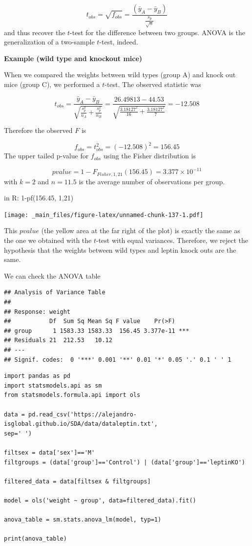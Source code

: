 \documentclass[
]{book}
\begin{document}
\[t_{obs}=\sqrt{f_{obs}}=\frac{(\bar{y}_{A}-\bar{y}_{B})}{\frac{s_p}{\sqrt{n}}}\]
and thus recover the \(t\)-test for the difference between two groups. ANOVA is the generalization of a two-sample \(t\)-test, indeed.

\textbf{Example (wild type and knockout mice)}

When we compared the weights between wild types (group A) and knock out mice (group C), we performed a \(t\)-test. The observed statistic was

\[t_{obs}=\frac{\bar{y}_A-\bar{y}_B }{\sqrt{\frac{s^2_p}{n_A}+\frac{s^2_p}{n_B}}}=\frac{26.49813-44.53}{\sqrt{\frac{3.18127^2}{16}+\frac{3.18127^2}{7}}}=-12.508\]

Therefore the observed \(F\) is

\[f_{obs}=t_{obs}^2=(−12.508)^2=156.45\]
The upper tailed p-value for \(f_{obs}\) using the Fisher distribution is

\[pvalue=1-F_{Fisher,1,21}(156.45)=3.377 \times 10^{-11}\] with \(k=2\) and \(n=11.5\) is the average number of observations per group.

in R: 1-pf(156.45, 1,21)

\texttt{[image: \_main\_files/figure-latex/unnamed-chunk-137-1.pdf]}

This \(pvalue\) (the yellow area at the far right of the plot) is exactly the same as the one we obtained with the \(t\)-test with equal variances. Therefore, we reject the hypothesis that the weights between wild types and leptin knock outs are the same.

We can check the ANOVA table

\begin{verbatim}
## Analysis of Variance Table
## 
## Response: weight
##           Df  Sum Sq Mean Sq F value    Pr(>F)    
## group      1 1583.33 1583.33  156.45 3.377e-11 ***
## Residuals 21  212.53   10.12                      
## ---
## Signif. codes:  0 '***' 0.001 '**' 0.01 '*' 0.05 '.' 0.1 ' ' 1
\end{verbatim}

\begin{verbatim}
import pandas as pd
import statsmodels.api as sm
from statsmodels.formula.api import ols

data = pd.read_csv('https://alejandro-isglobal.github.io/SDA/data/dataleptin.txt', 
sep=' ')

filtsex = data['sex']=='M'
filtgroups = (data['group']=='Control') | (data['group']=='leptinKO')

filtered_data = data[filtsex & filtgroups]

model = ols('weight ~ group', data=filtered_data).fit()

anova_table = sm.stats.anova_lm(model, typ=1)

print(anova_table)
\end{verbatim}
\end{document}
